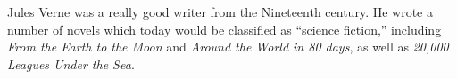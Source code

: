 Jules Verne was a really good writer from the Nineteenth century.  He wrote a number of
novels which today would be classified as ``science fiction,'' including \textit{From the
Earth to the Moon} and \textit{Around the World in 80 days}, as well as \textit{20,000 
Leagues Under the Sea}.
